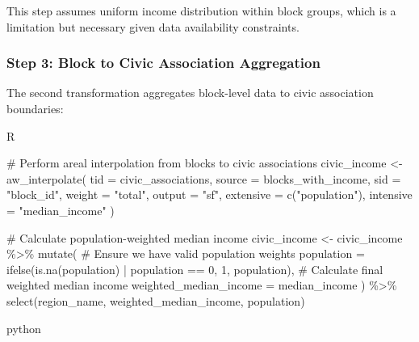 \documentclass[
  letterpaper,
  DIV=11,
  numbers=noendperiod]{scrartcl}
\newenvironment{Shaded}{\begin{snugshade}}{\end{snugshade}}
\newcommand{\AttributeTok}[1]{\textcolor[rgb]{0.40,0.45,0.13}{#1}}
\newcommand{\CommentTok}[1]{\textcolor[rgb]{0.37,0.37,0.37}{#1}}
\newcommand{\DecValTok}[1]{\textcolor[rgb]{0.68,0.00,0.00}{#1}}
\newcommand{\FunctionTok}[1]{\textcolor[rgb]{0.28,0.35,0.67}{#1}}
\newcommand{\NormalTok}[1]{\textcolor[rgb]{0.00,0.23,0.31}{#1}}
\newcommand{\OtherTok}[1]{\textcolor[rgb]{0.00,0.23,0.31}{#1}}
\newcommand{\SpecialCharTok}[1]{\textcolor[rgb]{0.37,0.37,0.37}{#1}}
\newcommand{\StringTok}[1]{\textcolor[rgb]{0.13,0.47,0.30}{#1}}
\begin{document}
This step assumes uniform income distribution within block groups, which
is a limitation but necessary given data availability constraints.

\subsubsection{Step 3: Block to Civic Association
Aggregation}\label{step-3-block-to-civic-association-aggregation}

The second transformation aggregates block-level data to civic
association boundaries:

R

\begin{Shaded}
\begin{Highlighting}[]
\CommentTok{\# Perform areal interpolation from blocks to civic associations}
\NormalTok{civic\_income }\OtherTok{\textless{}{-}} \FunctionTok{aw\_interpolate}\NormalTok{(}
  \AttributeTok{tid =}\NormalTok{ civic\_associations,}
  \AttributeTok{source =}\NormalTok{ blocks\_with\_income,}
  \AttributeTok{sid =} \StringTok{"block\_id"}\NormalTok{,}
  \AttributeTok{weight =} \StringTok{"total"}\NormalTok{,}
  \AttributeTok{output =} \StringTok{"sf"}\NormalTok{,}
  \AttributeTok{extensive =} \FunctionTok{c}\NormalTok{(}\StringTok{"population"}\NormalTok{),}
  \AttributeTok{intensive =} \StringTok{"median\_income"}
\NormalTok{)}

\CommentTok{\# Calculate population{-}weighted median income}
\NormalTok{civic\_income }\OtherTok{\textless{}{-}}\NormalTok{ civic\_income }\SpecialCharTok{\%\textgreater{}\%}
  \FunctionTok{mutate}\NormalTok{(}
    \CommentTok{\# Ensure we have valid population weights}
    \AttributeTok{population =} \FunctionTok{ifelse}\NormalTok{(}\FunctionTok{is.na}\NormalTok{(population) }\SpecialCharTok{|}\NormalTok{ population }\SpecialCharTok{==} \DecValTok{0}\NormalTok{, }\DecValTok{1}\NormalTok{, population),}
    \CommentTok{\# Calculate final weighted median income}
    \AttributeTok{weighted\_median\_income =}\NormalTok{ median\_income}
\NormalTok{  ) }\SpecialCharTok{\%\textgreater{}\%}
  \FunctionTok{select}\NormalTok{(region\_name, weighted\_median\_income, population)}
\end{Highlighting}
\end{Shaded}

python
\end{document}
